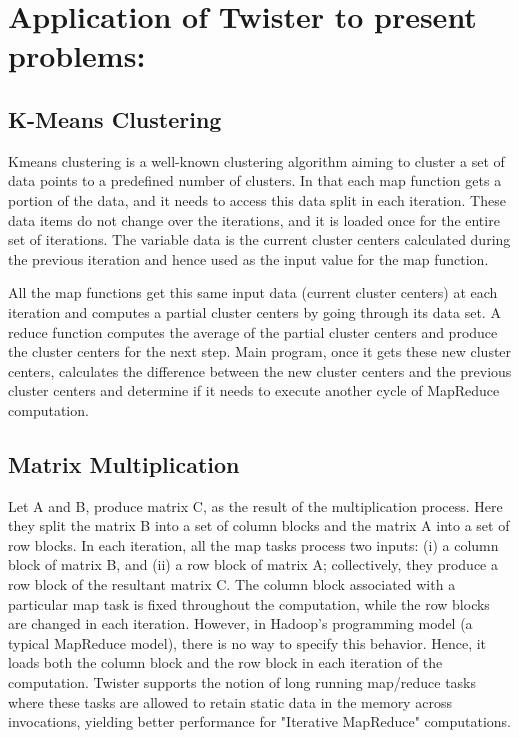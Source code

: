 \documentclass[9pt,twocolumn,twoside]{styles/osajnl}
\begin{document}
\section{Application of Twister to present problems:}

\subsection{K-Means Clustering}
Kmeans clustering is a well-known clustering algorithm aiming to
cluster a set of data points to a predefined number of clusters. In
that each map function gets a portion of the data, and it needs to
access this data split in each iteration. These data items do not
change over the iterations, and it is loaded once for the entire set
of iterations. The variable data is the current cluster centers
calculated during the previous iteration and hence used as the input
value for the map function\cite{twister}\cite{dean2008mapreduce}.

All the map functions get this same input data (current cluster
centers) at each iteration and computes a partial cluster centers by
going through its data set. A reduce function computes the average of
the partial cluster centers and produce the cluster centers for the
next step. Main program, once it gets these new cluster centers,
calculates the difference between the new cluster centers and the
previous cluster centers and determine if it needs to execute another
cycle of MapReduce
computation\cite{ekanayake2008mapreduce}\cite{twister}.


\subsection{Matrix Multiplication}
Let A and B, produce matrix C, as the result of the multiplication
process. Here they split the matrix B into a set of column blocks and
the matrix A into a set of row blocks. In each iteration, all the map
tasks process two inputs: (i) a column block of matrix B, and (ii) a
row block of matrix A; collectively, they produce a row block of the
resultant matrix C. The column block associated with a particular map
task is fixed throughout the computation, while the row blocks are
changed in each iteration. However, in Hadoop's programming model (a
typical MapReduce model), there is no way to specify this behavior.
Hence, it loads both the column block and the row block in each
iteration of the computation. Twister supports the notion of long
running map/reduce tasks where these tasks are allowed to retain
static data in the memory across invocations, yielding better
performance for "Iterative MapReduce"
computations\cite{dean2008mapreduce}\cite{twister}.
\end{document}
